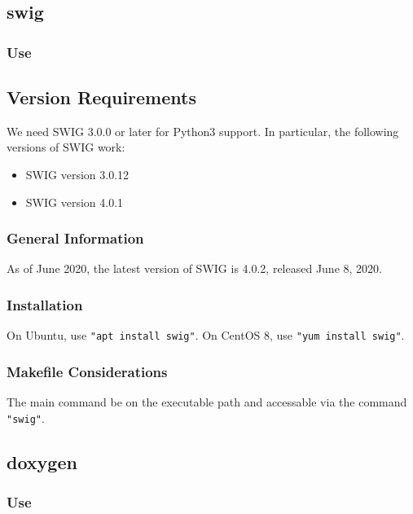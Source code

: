 \documentclass{article}
\begin{document}
\subsection{swig}
\subsubsection{Use}
\subsection{Version Requirements}
We need SWIG 3.0.0 or later for Python3 support.
In particular, the following versions of SWIG work:
\begin{itemize}
\item SWIG version 3.0.12
\item SWIG version 4.0.1
\end{itemize}
\subsubsection{General Information}
As of June 2020, the latest version of SWIG is 4.0.2,
released June 8, 2020.
\subsubsection{Installation}
On Ubuntu, use {\tt "apt install swig"}.
On CentOS 8, use {\tt "yum install swig"}.
\subsubsection{Makefile Considerations}
The main command be on the executable path and accessable
via the command \texttt{"swig"}.

\subsection{doxygen}
\subsubsection{Use}
\end{document}
